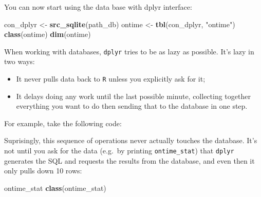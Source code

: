 \documentclass[]{book}
\newenvironment{Shaded}{\begin{snugshade}}{\end{snugshade}}
\newcommand{\KeywordTok}[1]{\textcolor[rgb]{0.13,0.29,0.53}{\textbf{{#1}}}}
\newcommand{\DataTypeTok}[1]{\textcolor[rgb]{0.13,0.29,0.53}{{#1}}}
\newcommand{\StringTok}[1]{\textcolor[rgb]{0.31,0.60,0.02}{{#1}}}
\newcommand{\NormalTok}[1]{{#1}}
\providecommand{\tightlist}{%
  \setlength{\itemsep}{0pt}\setlength{\parskip}{0pt}}
\def\tightlist{}
\begin{document}
You can now start using the data base with dplyr interface:

\begin{Shaded}
\begin{Highlighting}[]
\NormalTok{con_dplyr <-}\StringTok{ }\KeywordTok{src_sqlite}\NormalTok{(path_db)}
\NormalTok{ontime <-}\StringTok{ }\KeywordTok{tbl}\NormalTok{(con_dplyr, }\StringTok{"ontime"}\NormalTok{)}
\KeywordTok{class}\NormalTok{(ontime)}
\KeywordTok{dim}\NormalTok{(ontime)}
\end{Highlighting}
\end{Shaded}

When working with databases, \texttt{dplyr} tries to be as lazy as
possible. It's lazy in two ways:

\begin{itemize}
\tightlist
\item
  It never pulls data back to \texttt{R} unless you explicitly ask for
  it;
\item
  It delays doing any work until the last possible minute, collecting
  together everything you want to do then sending that to the database
  in one step.
\end{itemize}

For example, take the following code:

\begin{Shaded}
\end{Shaded}

Suprisingly, this sequence of operations never actually touches the
database. It's not until you ask for the data (e.g.~by printing
\texttt{ontime\_stat}) that \texttt{dplyr} generates the SQL and
requests the results from the database, and even then it only pulls down
10 rows:

\begin{Shaded}
\begin{Highlighting}[]
\NormalTok{ontime_stat}
\KeywordTok{class}\NormalTok{(ontime_stat)}
\end{Highlighting}
\end{Shaded}
\end{document}
